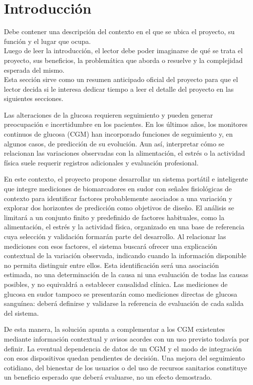 \section{Introducción}
{\consigna
Debe contener una descripción del contexto en el que se ubica el proyecto, su función y el lugar que ocupa.\\
Luego de leer la introducción, el lector debe poder imaginarse de qué se trata el proyecto, sus beneficios, la problemática que aborda o resuelve y la complejidad esperada del mismo.\\
Esta sección sirve como un resumen anticipado oficial del proyecto para que el lector decida si le interesa dedicar tiempo a leer el detalle del proyecto en las siguientes secciones.
}

Las alteraciones de la glucosa requieren seguimiento y pueden generar preocupación e incertidumbre en los pacientes. En los últimos años, los monitores continuos de glucosa (CGM) han incorporado funciones de seguimiento y, en algunos casos, de predicción de su evolución. Aun así, interpretar cómo se relacionan las variaciones observadas con la alimentación, el estrés o la actividad física suele requerir registros adicionales y evaluación profesional.

En este contexto, el proyecto propone desarrollar un sistema portátil e inteligente que integre mediciones de biomarcadores en sudor con señales fisiológicas de contexto para identificar factores probablemente asociados a una variación y explorar dos horizontes de predicción como objetivos de diseño. El análisis se limitará a un conjunto finito y predefinido de factores habituales, como la alimentación, el estrés y la actividad física, organizado en una base de referencia cuya selección y validación formarán parte del desarrollo. Al relacionar las mediciones con esos factores, el sistema buscará ofrecer una explicación contextual de la variación observada, indicando cuando la información disponible no permita distinguir entre ellos. Esta identificación será una asociación estimada, no una determinación de la causa ni una evaluación de todas las causas posibles, y no equivaldrá a establecer causalidad clínica. Las mediciones de glucosa en sudor tampoco se presentarán como mediciones directas de glucosa sanguínea: deberá definirse y validarse la referencia de evaluación de cada salida del sistema.

De esta manera, la solución apunta a complementar a los CGM existentes mediante información contextual y avisos acordes con un uso previsto todavía por definir. La eventual dependencia de datos de un CGM y el modo de integración con esos dispositivos quedan pendientes de decisión. Una mejora del seguimiento cotidiano, del bienestar de los usuarios o del uso de recursos sanitarios constituye un beneficio esperado que deberá evaluarse, no un efecto demostrado.